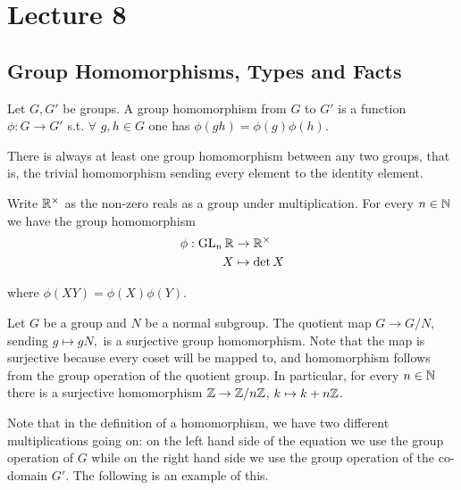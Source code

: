 \section{Lecture 8}
\subsection{Group Homomorphisms, Types and Facts}

\begin{definition}
  Let $G,G'$ be groups. A group homomorphism from $G$ to $G'$ is a function $\phi:G\to G'$
  s.t. $\forall$ $g,h\in G$ one has $\phi(gh)=\phi(g) \phi(h)$.
  \label{groupHomomorphism}
\end{definition}

\begin{remark}
  There is always at least one group homomorphism between any two groups, that is, the trivial homomorphism sending every element to the identity element.
\end{remark}

\begin{example}
  Write $\mathbb R^{\times}$ as the non-zero reals as a group under multiplication. For every $n\in\mathbb N$
  we have the group homomorphism
  \begin{align*}
      \phi: \operatorname{GL}_n \mathbb R &\to \mathbb R^{\times}
      \\ X&\mapsto \det X
  \end{align*}
  
  where $\phi(XY)=\phi(X)\phi(Y)$. 
\end{example}


\begin{example}
  Let $G$ be a group and $N$ be a normal subgroup. The quotient map $G\to G/N$, sending $g\mapsto gN,$
  is a surjective group homomorphism. Note that the map is surjective because every coset will be mapped to, and homomorphism follows from the group operation of the quotient
  group. In particular, for every $n\in\mathbb N$ there is a surjective homomorphism $\mathbb Z\to
  \mathbb Z/n\mathbb Z$, $k\mapsto k+n\mathbb Z$.
\end{example}
\begin{remark}
    Note that in the definition of a homomorphism, we have two different multiplications going on: on the left hand side of the equation we use the group operation of $G$ while on the right hand side we use the group operation of the co-domain $G′$. The following is an example of this.
\end{remark}

